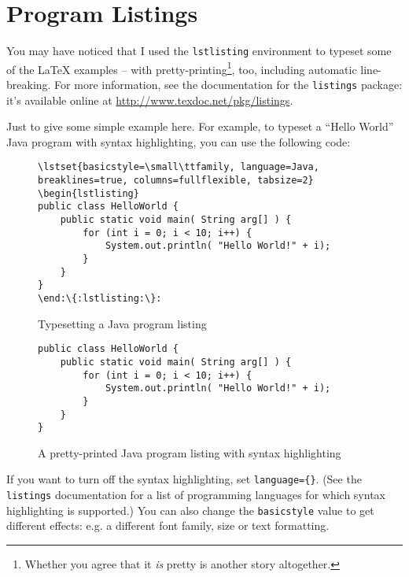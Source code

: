 \section{Program Listings}

You may have noticed that I used the \verb|lstlisting| environment to typeset some of the \LaTeX{} examples -- with pretty-printing\footnote{Whether you agree that it \emph{is} pretty is another story altogether.}, too, including automatic line-breaking.  For more information, see the documentation for the \verb|listings| package: it's available online at \url{http://www.texdoc.net/pkg/listings}.

Just to give some simple example here.  For example, to typeset a ``Hello World'' Java program with syntax highlighting, you can use the following code:

\begin{figure}[hbt!]
\begin{lstlisting}[escapechar=:,language={}]
\lstset{basicstyle=\small\ttfamily, language=Java, breaklines=true, columns=fullflexible, tabsize=2}
\begin{lstlisting}
public class HelloWorld {
	public static void main( String arg[] ) {
        for (int i = 0; i < 10; i++) {
			System.out.println( "Hello World!" + i);
		}
	}
}
\end:\{:lstlisting:\}:
\end{lstlisting}
\caption{Typesetting a Java program listing}\label{fig:lst:syntax}
\end{figure}

\begin{figure}[hbt!]
\lstset{basicstyle=\small\ttfamily, language=Java, breaklines=true, columns=fullflexible, framesep=10pt, xleftmargin=16pt, tabsize=2}
\begin{lstlisting}
public class HelloWorld {
	public static void main( String arg[] ) {
        for (int i = 0; i < 10; i++) {
			System.out.println( "Hello World!" + i);
		}
	}
}
\end{lstlisting}
\caption{A pretty-printed Java program listing with syntax highlighting}
\end{figure}


If you want to turn off the syntax highlighting, set \verb|language={}|.  (See the \verb|listings| documentation for a list of programming languages for which syntax highlighting is supported.)  You can also change the \verb|basicstyle| value to get different effects: e.g. a different font family, size or text formatting.

